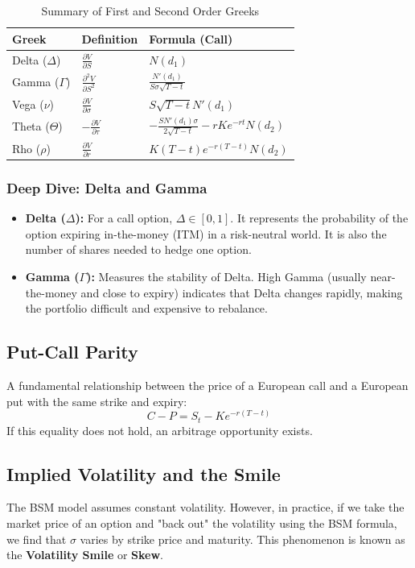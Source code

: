 \begin{table}[h!]
\centering
\begin{tabular}{|l|l|l|}
\hline
\textbf{Greek} & \textbf{Definition} & \textbf{Formula (Call)} \\ \hline
Delta ($\Delta$) & $\frac{\partial V}{\partial S}$ & $N(d_1)$ \\ \hline
Gamma ($\Gamma$) & $\frac{\partial^2 V}{\partial S^2}$ & $\frac{N'(d_1)}{S\sigma\sqrt{T-t}}$ \\ \hline
Vega ($\nu$) & $\frac{\partial V}{\partial \sigma}$ & $S\sqrt{T-t} N'(d_1)$ \\ \hline
Theta ($\Theta$) & $-\frac{\partial V}{\partial \tau}$ & $-\frac{S N'(d_1) \sigma}{2\sqrt{T-t}} - rKe^{-rt}N(d_2)$ \\ \hline
Rho ($\rho$) & $\frac{\partial V}{\partial r}$ & $K(T-t)e^{-r(T-t)}N(d_2)$ \\ \hline
\end{tabular}
\caption{Summary of First and Second Order Greeks}
\end{table}

\subsubsection{Deep Dive: Delta and Gamma}
\begin{itemize}
    \item \textbf{Delta ($\Delta$):} For a call option, $\Delta \in [0, 1]$. It represents the probability of the option expiring in-the-money (ITM) in a risk-neutral world. It is also the number of shares needed to hedge one option.
    \item \textbf{Gamma ($\Gamma$):} Measures the stability of Delta. High Gamma (usually near-the-money and close to expiry) indicates that Delta changes rapidly, making the portfolio difficult and expensive to rebalance.
\end{itemize}

\subsection{Put-Call Parity}
A fundamental relationship between the price of a European call and a European put with the same strike and expiry:
\begin{equation}
    C - P = S_t - Ke^{-r(T-t)}
\end{equation}
If this equality does not hold, an arbitrage opportunity exists.

\subsection{Implied Volatility and the Smile}
The BSM model assumes constant volatility. However, in practice, if we take the market price of an option and "back out" the volatility using the BSM formula, we find that $\sigma$ varies by strike price and maturity. This phenomenon is known as the \textbf{Volatility Smile} or \textbf{Skew}.